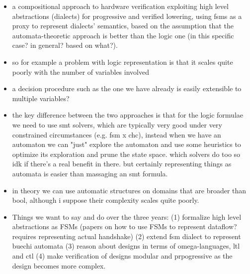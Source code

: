\documentclass[]{article}
\begin{document}
\begin{itemize}
    \item a compositional approach to hardware verification exploiting high level abstractions (dialects)
    for progressive and verified lowering, using fsms as a proxy to represent dialects' semantics, 
    based on the assumption that the automata-theoretic approach is better than the logic one (in this specific case? in general? based on what?).
    \item so for example a problem with logic representation is that it scales quite poorly with the number of variables involved
    \item a decision procedure such as the one we have already is easily extensible to multiple variables? 
    \item the key difference between the two approaches is that for the logic formulae we need to use smt solvers, which are typically very good under 
    very constrained circumstances (e.g. fsm x chc), instead when we have an automaton we can "just" explore the automaton and use some 
    heuristics to optimize its exploration and prune the state space. which solvers do too so idk if there's a real benefit in there. 
    but certainly representing things as automata is easier than massaging an smt formula. 
    \item in theory we can use automatic structures on domains that are broader than bool, although i suppose their complexity scales quite poorly. 
    \item Things we want to say and do over the three years: 
    (1) formalize high level abstractions as FSMs (papers on how to use FSMs to represent dataflow? requires representing actual handshake)
    (2) extend fsm dialect to represent buechi automata 
    (3) reason about designs in terms of omega-languages, ltl and ctl
    (4) make verification of designs modular and prpogressive as the design becomes more complex.
\end{itemize}
\end{document}
